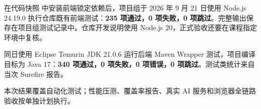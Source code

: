 在代码快照  中安装前端锁定依赖后，项目组于 2026 年 9 月 21 日使用 Node.js 24.19.0 执行仓库既有前端测试：\textbf{235 项通过，0 项失败，0 项跳过}。完整输出保存在项目组测试记录中。仓库开发说明使用 Node.js 20，正式验收还要在课程指定环境中复核。

同日使用 Eclipse Temurin JDK 21.0.6 运行后端 Maven Wrapper 测试，项目编译目标为 Java 17：\textbf{340 项通过，0 项失败，0 项错误，0 项跳过}。测试类统计来自当次 Surefire 报告。

本次结果覆盖自动化测试；性能压测、覆盖率报告、真实 AI 服务和浏览器全链路验收按单独计划执行。
